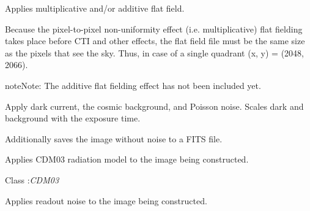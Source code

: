 \documentclass[a4paper,12pt,english]{sphinxmanual}
\begin{document}
\begin{fulllineitems}
\begin{fulllineitems}
\label{simulator:simulator.simulator.VISsimulator.applyFlatfield}
Applies multiplicative and/or additive flat field.

Because the pixel-to-pixel non-uniformity effect (i.e. multiplicative) flat fielding takes place
before CTI and other effects, the flat field file must be the same size as the pixels that see
the sky. Thus, in case of a single quadrant (x, y) = (2048, 2066).

\begin{notice}{note}{Note:}
The additive flat fielding effect has not been included yet.
\end{notice}

\end{fulllineitems}


\begin{fulllineitems}
\label{simulator:simulator.simulator.VISsimulator.applyNoise}
Apply dark current, the cosmic background, and Poisson noise.
Scales dark and background with the exposure time.

Additionally saves the image without noise to a FITS file.

\end{fulllineitems}


\begin{fulllineitems}
\label{simulator:simulator.simulator.VISsimulator.applyRadiationDamage}
Applies CDM03 radiation model to the image being constructed.




Class :\emph{CDM03}



\end{fulllineitems}


\begin{fulllineitems}
\label{simulator:simulator.simulator.VISsimulator.applyReadoutNoise}
Applies readout noise to the image being constructed.


\end{fulllineitems}
\end{fulllineitems}
\end{document}
